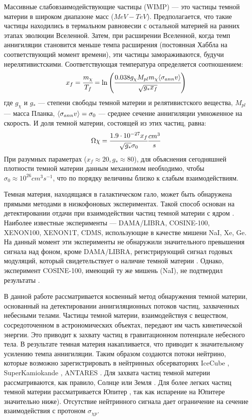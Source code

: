 Массивные слабовзаимодействующие частицы (WIMP) --- это частицы темной материи в широком диапазоне масс ($MeV-TeV$). Предполагается, что такие частицы находились в термальном равновесии с остальной материей на ранних этапах эволюции Вселенной. Затем, при расширении Вселенной, когда темп аннигиляции становится меньше темпа расширения (постоянная Хаббла на соответствующий момент времени), эти частицы замораживаются, будучи нерелятивистскими\cite{Kolb:1990vq}. Соответствующая температура определяется соотношением: 
\begin{equation}
	x_f = \cfrac{m_{\chi} }{T_f} = \ln {\left(\cfrac{0.038 g_{\chi} M_{pl} m_{\chi}  \langle \sigma_{ann} v \rangle}
		{\sqrt{g_* x_f}}\right)}
\end{equation}
где $g_{\chi}$ и $g_*$ --- степени свободы темной материи и релятивистского вещества, $M_{pl}$ --- масса Планка, $\langle \sigma_{ann} v \rangle = \sigma_0$ --- среднее сечение аннигиляции умноженное на скорость. И доля темной материи, состоящей из этих частиц, равна: 
\begin{equation}
	\Omega{\chi} = \cfrac{{1.9}\cdot 10^{-27} x_f}{\sqrt{g_*} \sigma_0} \frac{cm^3}{s}
\end{equation}
При разумных параметрах ($x_f \approx 20, g_* \approx 80$), для объяснения сегодняшней плотности темной материи данным механизмом необходимо, чтобы $\sigma_0 \approx 10^{26} cm^3s^{-1}$, что по порядку величины близко к слабым взаимодействиям.

Темная материя, находящаяся в галактическом гало, может быть обнаружена прямыми методами в низкофоновых экспериментах. Такой способ основан на детектировании отдачи при взаимодействии частиц темной материи с ядром \cite{Schumann_2019}. Наиболее известные эксперименты --- DAMA/LIBRA, COSINE-100, XENON100, XENON1T, CDMS, использующие в качестве мишени NaI, Xe, Ge. На данный момент эти эксперименты не обнаружили значительного превышения сигнала над фоном, кроме DAMA/LIBRA, регистрирующий сигнал годовых модуляций, который свидетельствует о наличие темной материи \cite{Bernabei_2018}. Однако, эксперимент COSINE-100, имеющий ту же мишень (NaI), не подтвердил результаты \cite{Adhikari_2022}.

В данной работе рассматривается косвенный метод обнаружения темной материи, основанный на детектировании аннигиляционных потоков частиц, захваченных небесными телами. Частицы темной материи, взаимодействуя с веществом, сосредоточенном в астрономических объектах, передают им часть кинетической энергии. Это приводит к захвату частиц в гравитационном потенциале небесного тела. В результате темная материя накапливается, что приводит к значительному усилению темпа аннигиляции. Таким образом создаются потоки нейтрино, которые возможно зарегистрировать в нейтринных обсерваториях  IceCube \cite{Aartsen_2017}, SuperKamiokande \cite{kamiokandecollaboration2015search}, ANTARES \cite{ADRIANMARTINEZ201669}. Для захвата частиц темной материи рассматриваются, как правило, Солнце \cite{1985ApJ...296..679P} или Земля \cite{1987ApJ...321..571G}. Для более легких частиц темной материи рассматривается Юпитер \cite{10.1103/physrevd.106.115037}, так как испарение на Юпитере значительно ниже). Отсутствие нейтринного сигнала дает ограничение на сечение взаимодействия с протоном $\sigma_{\chi p}$.

